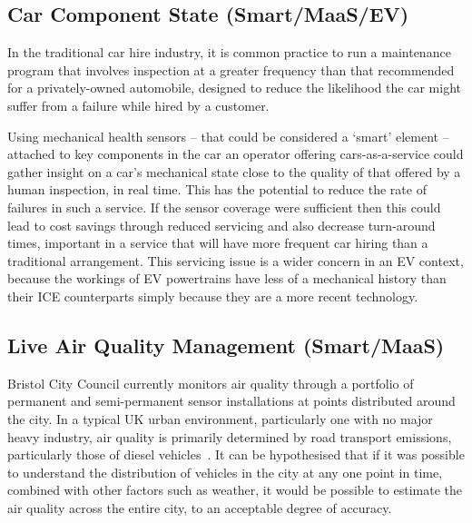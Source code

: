 \documentclass[b5paper,10pt]{article}
\begin{document}
\subsection{Car Component State (Smart/MaaS/EV)}

In the traditional car hire industry, it is common practice to run a
maintenance program that involves inspection at a greater frequency
than that recommended for a privately-owned automobile, designed to
reduce the likelihood the car might suffer from a failure while hired
by a customer.

Using mechanical health sensors -- that could be considered a `smart'
element -- attached to key components in the car an operator offering
cars-as-a-service could gather insight on a car's mechanical state
close to the quality of that offered by a human inspection, in real
time. This has the potential to reduce the rate of failures in such a
service. If the sensor coverage were sufficient then this could lead
to cost savings through reduced servicing and also decrease
turn-around times, important in a service that will have more frequent
car hiring than a traditional arrangement. This servicing issue is a
wider concern in an EV context, because the workings of EV
powertrains have less of a mechanical history than their ICE
counterparts simply because they are a more recent technology.


\subsection{Live Air Quality Management (Smart/MaaS)}

Bristol City Council currently monitors air quality through a
portfolio of permanent and semi-permanent sensor installations at
points distributed around the city. In a typical UK urban environment,
particularly one with no major heavy industry, air quality is
primarily determined by road transport emissions, particularly those
of diesel vehicles~\citep{bbcnews:2017,glaaqd:2018}. It can be
hypothesised that if it was possible to understand the distribution of
vehicles in the city at any one point in time, combined with other
factors such as weather, it would be possible to estimate the air
quality across the entire city, to an acceptable degree of accuracy.
\end{document}
